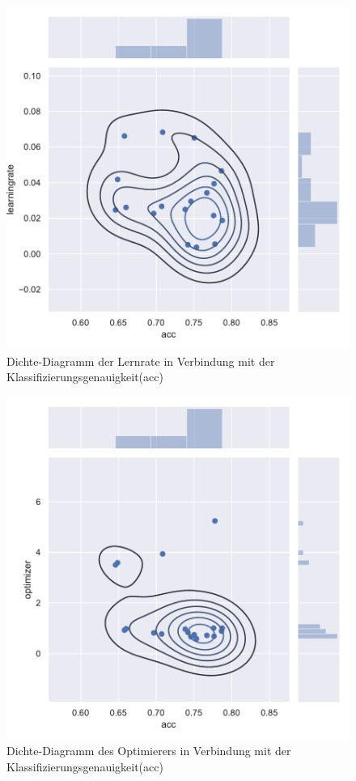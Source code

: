 \begin{figure}[H]
  \centering  
  \includegraphics[scale=0.5]{anhang/GA_50_cifar10_False_big_jointplot_learningrate.pdf}
  \caption{Dichte-Diagramm der Lernrate in Verbindung mit der Klassifizierungsgenauigkeit(acc)}
  
\end{figure}

\begin{figure}[H]
  \centering  
  \includegraphics[scale=0.5]{anhang/GA_50_cifar10_False_big_jointplot_optimizer.pdf}
  \caption{Dichte-Diagramm des Optimierers in Verbindung mit der Klassifizierungsgenauigkeit(acc)}
\end{figure}

